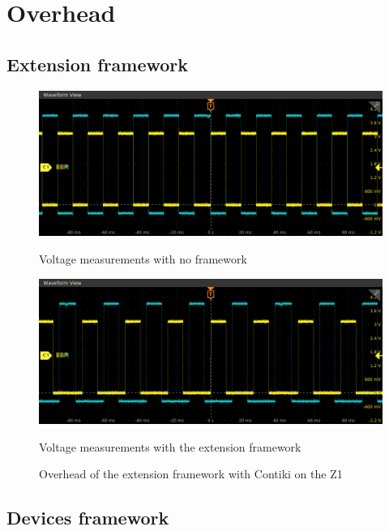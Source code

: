 \section{Overhead}

\subsection{Extension framework}

\begin{figure}[!ht]
  \begin{minipage}{.45\textwidth}
      \centering
      \includegraphics[scale=.25]{assets/reference-value-overhead-contiki-z1.png}
      \caption*{Voltage measurements with no framework}
  \end{minipage}\hfill
  \begin{minipage}{.45\textwidth}        
      \centering
      \includegraphics[scale=.25]{assets/extension-framework-overhead-contiki-z1.png}
      \caption*{Voltage measurements with the extension framework}
  \end{minipage}
  \caption{Overhead of the extension framework with Contiki on the Z1}
\end{figure}

\subsection{Devices framework}


